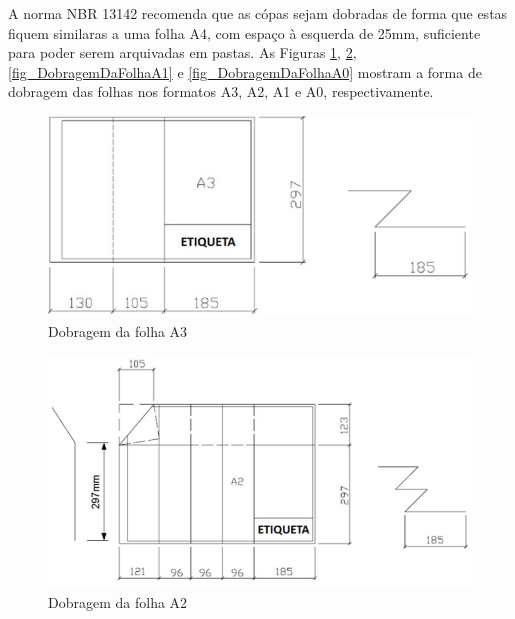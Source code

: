 \documentclass{article}
\begin{document}
\hspace{1cm} A norma NBR 13142 recomenda que as cópas sejam dobradas de forma que estas fiquem similaras a uma folha A4, com espaço à esquerda de 25mm, suficiente para poder serem arquivadas em pastas. As Figuras \ref{fig_DobragemDaFolhaA3}, \ref{fig_DobragemDaFolhaA2}, \ref{fig_DobragemDaFolhaA1} e \ref{fig_DobragemDaFolhaA0} mostram a forma de dobragem das folhas nos formatos A3, A2, A1 e A0, respectivamente. 

\begin{figure} [H] %
\centering
\includegraphics[scale=0.8]{Fig/Figura_DobragemFolhaA3.png} 
\caption{Dobragem da folha A3}
\label{fig_DobragemDaFolhaA3}
\end{figure}

\begin{figure} [H] %
\centering
\includegraphics[scale=0.8]{Fig/Figura_DobragemFolhaA2.png} 
\caption{Dobragem da folha A2}
\label{fig_DobragemDaFolhaA2}
\end{figure}
\end{document}
